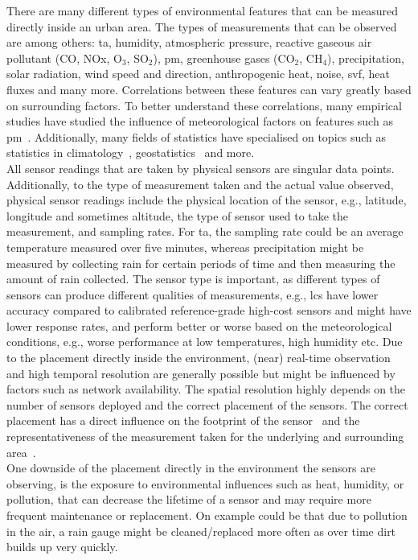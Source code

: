 There are many different types of environmental features that can be measured directly inside an urban area. The types of measurements that can be observed are among others: \gls{ta}, humidity, atmospheric pressure, reactive gaseous air pollutant (CO, NOx, O$_3$, SO$_2$), \gls{pm}, greenhouse gases (CO$_2$, CH$_4$), precipitation, solar radiation, wind speed and direction, anthropogenic heat, noise, \gls{svf}, heat fluxes and many more.
Correlations between these features can vary greatly based on surrounding factors. To better understand these correlations, many empirical studies have studied the influence of meteorological factors on features such as \gls{pm}~\cite{tai2010correlations}. Additionally, many fields of statistics have specialised on topics such as statistics in climatology~\cite{von2002statistical}, geostatistics~\cite{trangmar1986application} and more.\\
All sensor readings that are taken by physical sensors are singular data points. Additionally, to the type of measurement taken and the actual value observed, physical sensor readings include the physical location of the sensor, e.g., latitude, longitude and sometimes altitude, the type of sensor used to take the measurement, and sampling rates. For \gls{ta}, the sampling rate could be an average temperature measured over five minutes, whereas precipitation might be measured by collecting rain for certain periods of time and then measuring the amount of rain collected. The sensor type is important, as different types of sensors can produce different qualities of measurements, e.g., \gls{lcs} have lower accuracy compared to calibrated reference-grade high-cost sensors and might have lower response rates, and perform better or worse based on the meteorological conditions, e.g., worse performance at low temperatures, high humidity etc. Due to the placement directly inside the environment, (near) real-time observation and high temporal resolution are generally possible but might be influenced by factors such as network availability. The spatial resolution highly depends on the number of sensors deployed and the correct placement of the sensors. The correct placement has a direct influence on the footprint of the sensor~\cite{leclerc2014footprints} and the representativeness of the measurement taken for the underlying and surrounding area~\cite{oke2006guideline}.\\
One downside of the placement directly in the environment the sensors are observing, is the exposure to environmental influences such as heat, humidity, or pollution, that can decrease the lifetime of a sensor and may require more frequent maintenance or replacement. On example could be that due to pollution in the air, a rain gauge might be cleaned/replaced more often as over time dirt builds up very quickly.

